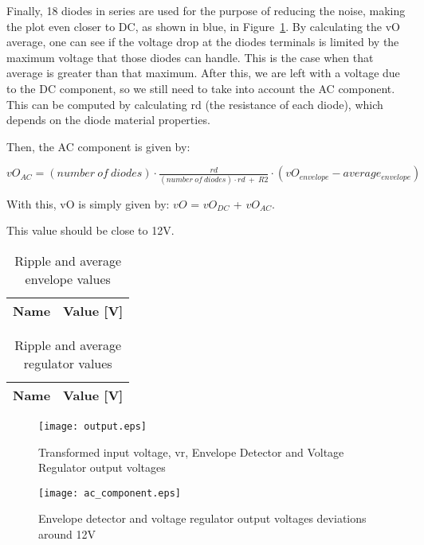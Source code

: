 Finally, 18 diodes in series are used for the purpose of reducing the noise, making the plot even closer to DC, as shown in blue, in Figure~\ref{fig:output}. By calculating the vO average, one can see if the voltage drop at the diodes terminals is limited by the maximum voltage that those diodes can handle. This is the case when that average is greater than that maximum. After this, we are left with a voltage due to the DC component, so we still need to take into account the AC component. This can be computed by calculating rd (the resistance of each diode), which depends on the diode material properties.

Then, the AC component is given by:

\vspace{0.5cm}

$vO_{AC} = (number~of~diodes) \cdot \frac{rd}{(number~of~diodes)\cdot rd~+~R2} \cdot (vO_{envelope}-average_{envelope})$

\vspace{0.5cm}


With this, vO is simply given by: $vO$ = $vO_{DC}$ + $vO_{AC}$.

This value should be close to 12V.

\begin{table}[ht]
  \centering
  \begin{tabular}{|l|r|}
    \hline    
	  {\bf Name} & {\bf Value [V]} \\ \hline
	
  \end{tabular}
  \caption{Ripple and average envelope values}
	\label{tab:envelope}
\end{table}

\begin{table}[ht]
  \centering
  \begin{tabular}{|l|r|}
    \hline    
	  {\bf Name} & {\bf Value [V]} \\ \hline
        
  \end{tabular}
  \caption{Ripple and average regulator values} 
        \label{tab:regulator}
\end{table}     





\begin{figure}[h] \centering
\texttt{[image: output.eps]}
	\caption{Transformed input voltage, vr, Envelope Detector and Voltage Regulator output voltages}
	\label{fig:output}
\end{figure}

\begin{figure}[h] \centering                                          
\texttt{[image: ac\_component.eps]}          
	\caption{Envelope detector and voltage regulator output voltages deviations around 12V}                                   
        \label{fig:ac_dc}                                            
\end{figure}








